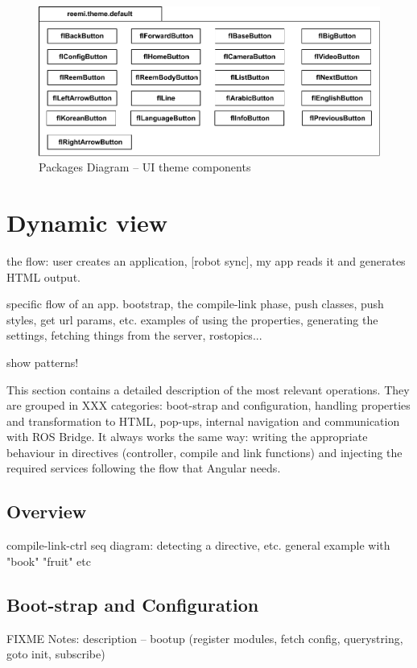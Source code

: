 \begin{figure}[htb]
    \centering
    \includegraphics{figures/design-package-uithemecomponents.pdf}
    \caption{Packages Diagram -- UI theme components}
    \label{fig:pkg-themecomponents}
\end{figure}

\FloatBarrier

\section{Dynamic view}
the flow: user creates an application, [robot sync], my app reads it and generates HTML output.

specific flow of an app. bootstrap, the compile-link phase, push classes, push styles, get url params, etc.
examples of using the properties, generating the settings, fetching things from the server, rostopics...

show patterns!

This section contains a detailed description of the most relevant operations.
They are grouped in XXX categories: boot-strap and configuration, handling properties and transformation to \ac{HTML}, pop-ups, internal navigation and communication with ROS Bridge.
It always works the same way: writing the appropriate behaviour in directives (controller, compile and link functions) and injecting the required services following the flow that Angular needs.

\subsection{Overview}
compile-link-ctrl
seq diagram: detecting a directive, etc. general example with "book" "fruit" etc

\subsection{Boot-strap and Configuration}
FIXME Notes: description -- bootup (register modules, fetch config, querystring, goto init, subscribe)

